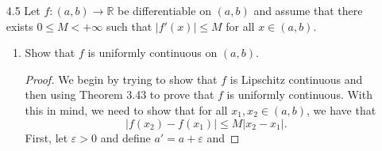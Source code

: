 \documentclass[12pt]{article}
\theoremstyle{definition}
\newcommand{\abs}[1]{\lvert #1 \rvert}
\begin{document}
\begin{enumerate}
\begin{enumerate}[label=(\alph*)]
\begin{proof}
                            functions. We have that 
                                \begin{equation*}
                                    f'(x)=px^{p-1}\sin\frac{1}{x}-x^{p-2}\cos\frac{1}{x}
                                \end{equation*}
                            and so for $0\leq p\leq 1$, $\lim_{x\to 0}f'(x)$
                            does not exist and so $f'$ is not continuous. For
                            $p\geq 2$, we have that $\lim_{x\to 0}f'(x)=0$ and
                            thus $f'$ is continuous for $p\geq 2$.
                        \end{proof}
                    \item For what values of $p$ is $f$ differentiable on $\mathbb{R}$?
                        \begin{proof}
                            Note that the exponents on the $x$ term in $f''$
                            are $p-2$ and $p-3$, respectively. Thus from the
                            difference quotient we obtain a power of $p-4$ on
                            some of the $x$ terms. Hence, for $p>4$, it follows
                            that $f$ is twice differentiable on $\mathbb{R}$.
                        \end{proof}
                \end{enumerate}
            \item[4.5] Let $f:(a, b)\to\mathbb{R}$ be differentiable on
                $(a, b)$ and assume that there exists $0\leq M<+\infty$ such
                that $\abs{f'(x)}\leq M$ for all $x\in(a, b)$.
                \begin{enumerate}[label=(\arabic*)]
                    \item Show that $f$ is uniformly continuous on $(a, b)$.
                        \begin{proof}
                            We begin by trying to show that $f$ is Lipschitz
                            continuous and then using Theorem 3.43 to prove that
                            $f$ is uniformly continuous. With this in mind, we
                            need to show that for all $x_1, x_2\in(a, b)$, we
                            have that
                                \begin{equation*}
                                    \abs{f(x_2)-f(x_1)}\leq M\abs{x_2-x_1}.
                                \end{equation*}
                            First, let $\varepsilon>0$ and define $a'=a+\varepsilon$ and

\end{proof}
\end{enumerate}
\end{enumerate}
\end{document}
